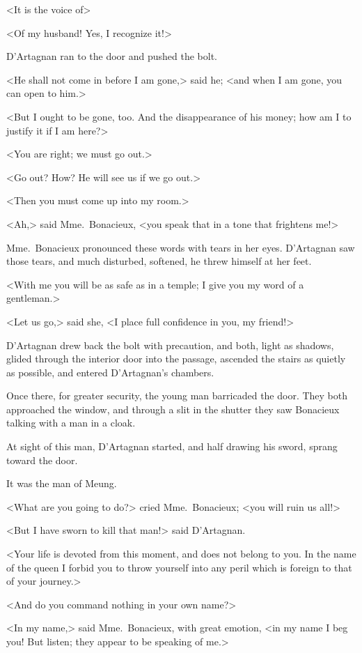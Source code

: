 <It is the voice of\longdash> 

<Of my husband! Yes, I recognize it!> 

D'Artagnan ran to the door and pushed the bolt. 

<He shall not come in before I am gone,> said he; <and when I am gone, you can open to him.> 

<But I ought to be gone, too. And the disappearance of his money; how am I to justify it if I am here?> 

<You are right; we must go out.> 

<Go out? How? He will see us if we go out.> 

<Then you must come up into my room.> 

<Ah,> said Mme.~Bonacieux, <you speak that in a tone that frightens me!> 

Mme.~Bonacieux pronounced these words with tears in her eyes. D'Artagnan saw those tears, and much disturbed, softened, he threw himself at her feet. 

<With me you will be as safe as in a temple; I give you my word of a gentleman.> 

<Let us go,> said she, <I place full confidence in you, my friend!> 

D'Artagnan drew back the bolt with precaution, and both, light as shadows, glided through the interior door into the passage, ascended the stairs as quietly as possible, and entered D'Artagnan's chambers. 

Once there, for greater security, the young man barricaded the door. They both approached the window, and through a slit in the shutter they saw Bonacieux talking with a man in a cloak. 

At sight of this man, D'Artagnan started, and half drawing his sword, sprang toward the door. 

It was the man of Meung. 

<What are you going to do?> cried Mme.~Bonacieux; <you will ruin us all!> 

<But I have sworn to kill that man!> said D'Artagnan. 

<Your life is devoted from this moment, and does not belong to you. In the name of the queen I forbid you to throw yourself into any peril which is foreign to that of your journey.> 

<And do you command nothing in your own name?> 

<In my name,> said Mme.~Bonacieux, with great emotion, <in my name I beg you! But listen; they appear to be speaking of me.> 

